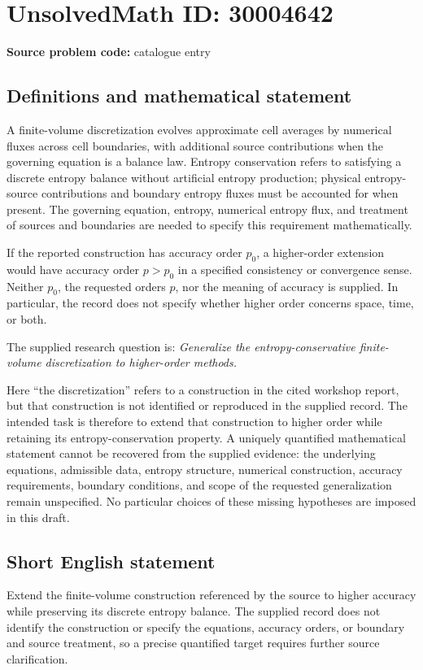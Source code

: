 \documentclass[11pt]{article}
\begin{document}
\section*{UnsolvedMath ID: 30004642}
\textbf{Source problem code:} catalogue entry
\subsection{Definitions and mathematical statement}
A finite-volume discretization evolves approximate cell averages by numerical fluxes across cell boundaries, with additional source contributions when the governing equation is a balance law. Entropy conservation refers to satisfying a discrete entropy balance without artificial entropy production; physical entropy-source contributions and boundary entropy fluxes must be accounted for when present. The governing equation, entropy, numerical entropy flux, and treatment of sources and boundaries are needed to specify this requirement mathematically.

If the reported construction has accuracy order \(p_0\), a higher-order extension would have accuracy order \(p>p_0\) in a specified consistency or convergence sense. Neither \(p_0\), the requested orders \(p\), nor the meaning of accuracy is supplied. In particular, the record does not specify whether higher order concerns space, time, or both.

The supplied research question is: \emph{Generalize the entropy-conservative finite-volume discretization to higher-order methods.}

Here ``the discretization'' refers to a construction in the cited workshop report, but that construction is not identified or reproduced in the supplied record. The intended task is therefore to extend that construction to higher order while retaining its entropy-conservation property. A uniquely quantified mathematical statement cannot be recovered from the supplied evidence: the underlying equations, admissible data, entropy structure, numerical construction, accuracy requirements, boundary conditions, and scope of the requested generalization remain unspecified. No particular choices of these missing hypotheses are imposed in this draft.
\subsection{Short English statement}
Extend the finite-volume construction referenced by the source to higher accuracy while preserving its discrete entropy balance. The supplied record does not identify the construction or specify the equations, accuracy orders, or boundary and source treatment, so a precise quantified target requires further source clarification.
\end{document}
